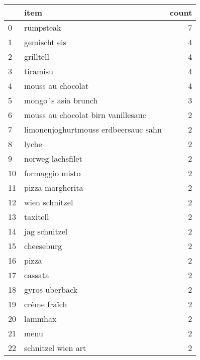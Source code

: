 \begin{tabular}{llr}
\toprule
{} &                                               item &  count \\
\midrule
0   &                                          rumpsteak &      7 \\
1   &                                       gemischt eis &      4 \\
2   &                                          grilltell &      4 \\
3   &                                           tiramisu &      4 \\
4   &                                  mouss au chocolat &      4 \\
5   &                                mongo´s asia brunch &      3 \\
6   &                 mouss au chocolat birn vanillesauc &      2 \\
7   &               limonenjoghurtmouss erdbeersauc sahn &      2 \\
8   &                                              lyche &      2 \\
9   &                                  norweg lachsfilet &      2 \\
10  &                                    formaggio misto &      2 \\
11  &                                   pizza margherita &      2 \\
12  &                                     wien schnitzel &      2 \\
13  &                                           taxitell &      2 \\
14  &                                      jag schnitzel &      2 \\
15  &                                         cheeseburg &      2 \\
16  &                                              pizza &      2 \\
17  &                                            cassata &      2 \\
18  &                                     gyros uberback &      2 \\
19  &                                       crème fraîch &      2 \\
20  &                                            lammhax &      2 \\
21  &                                               menu &      2 \\
22  &                                 schnitzel wien art &      2 \\

\end{tabular}
